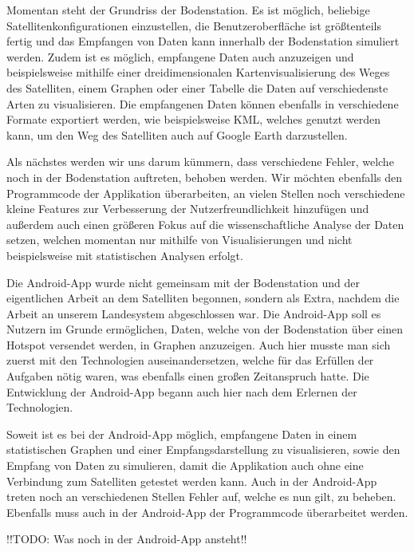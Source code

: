 Momentan steht der Grundriss der Bodenstation. Es ist möglich, beliebige Satellitenkonfigurationen einzustellen, die Benutzeroberfläche ist größtenteils fertig und das Empfangen von Daten kann innerhalb der Bodenstation simuliert werden. Zudem ist es möglich, empfangene Daten auch anzuzeigen und beispielsweise mithilfe einer dreidimensionalen Kartenvisualisierung des Weges des Satelliten, einem Graphen oder einer Tabelle die Daten auf verschiedenste Arten zu visualisieren. Die empfangenen Daten können ebenfalls in verschiedene Formate exportiert werden, wie beispielsweise KML, welches genutzt werden kann, um den Weg des Satelliten auch auf Google Earth darzustellen.

Als nächstes werden wir uns darum kümmern, dass verschiedene Fehler, welche noch in der Bodenstation auftreten, behoben werden. Wir möchten ebenfalls den Programmcode der Applikation überarbeiten, an vielen Stellen noch verschiedene kleine Features zur Verbesserung der Nutzerfreundlichkeit hinzufügen und außerdem auch einen größeren Fokus auf die wissenschaftliche Analyse der Daten setzen, welchen momentan nur mithilfe von Visualisierungen und nicht beispielsweise mit statistischen Analysen erfolgt.

Die Android-App wurde nicht gemeinsam mit der Bodenstation und der eigentlichen Arbeit an dem Satelliten begonnen, sondern als Extra, nachdem die Arbeit an unserem Landesystem abgeschlossen war. Die Android-App soll es Nutzern im Grunde ermöglichen, Daten, welche von der Bodenstation über einen Hotspot versendet werden, in Graphen anzuzeigen. Auch hier musste man sich zuerst mit den Technologien auseinandersetzen, welche für das Erfüllen der Aufgaben nötig waren, was ebenfalls einen großen Zeitanspruch hatte. Die Entwicklung der Android-App begann auch hier nach dem Erlernen der Technologien.

Soweit ist es bei der Android-App möglich, empfangene Daten in einem statistischen Graphen und einer Empfangsdarstellung zu visualisieren, sowie den Empfang von Daten zu simulieren, damit die Applikation auch ohne eine Verbindung zum Satelliten getestet werden kann. Auch in der Android-App treten noch an verschiedenen Stellen Fehler auf, welche es nun gilt, zu beheben. Ebenfalls muss auch in der Android-App der Programmcode überarbeitet werden.

!!TODO: Was noch in der Android-App ansteht!!